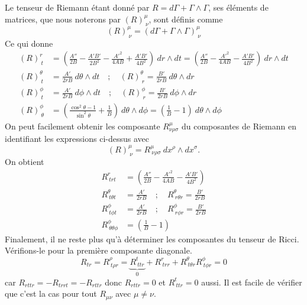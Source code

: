 \documentclass[a4paper,11pt]{report}
\theoremstyle{definition}
\theoremstyle{plain}
\theoremstyle{definition}
\theoremstyle{remark}
\begin{document}
        Le tenseur de Riemann étant donné par $R=d\Gamma+\Gamma\wedge\Gamma$, ses éléments de matrices, que nous noterons par $(R)^\mu_{~\nu}$, sont définis comme
        \begin{equation}
            (R)^\mu_{~\nu} = (d\Gamma+\Gamma\wedge\Gamma)^\mu_{~\nu}
        \end{equation}
        Ce qui donne
        \begin{align}
            (R)^r_{~t} &= \left( \frac{A''}{2B}-\frac{A'B'}{2B^2}-\frac{A'^2}{4AB}+\frac{A'B'}{4B^2} \right)~dr\wedge dt = \left( \frac{A''}{2B}-\frac{A'^2}{4AB}-\frac{A'B'}{4B^2} \right)~dr\wedge dt\\
            (R)^\theta_{~t} &= \frac{A'}{2rB}~d\theta\wedge dt\quad;\quad  (R)^\theta_{~r} = \frac{B'}{2rB}~d\theta\wedge dr\\
            (R)^\phi_{~t} &= \frac{A'}{2rB}~d\phi\wedge dt \quad;\quad (R)^\phi_{~r} = \frac{B'}{2rB}~d\phi\wedge dr\\
            (R)^\phi_{~\theta} &= \left( \frac{\cos^2\theta-1}{\sin^2\theta}+\frac{1}{B} \right)~d\theta\wedge d\phi = \left( \frac{1}{B}-1 \right)~d\theta\wedge d\phi
        \end{align}
        On peut facilement obtenir les composante $R^\mu_{\nu\rho\sigma}$ du composantes de Riemann en identifiant les expressions ci-dessus avec
        \begin{equation}
            (R)^\mu_{~\nu} = R^\mu_{~\nu\rho\sigma}~dx^\rho\wedge dx^\sigma.
        \end{equation}
        On obtient
        \begin{align}
            R^r_{~trt} &= \left( \frac{A''}{2B}-\frac{A'^2}{4AB}-\frac{A'B'}{4B^2} \right)\\
            R^\theta_{~t\theta t} &= \frac{A'}{2rB}\quad;\quad  R^\theta_{~r\theta r} = \frac{B'}{2rB}\\
            R^\phi_{~t\phi t} &= \frac{A'}{2rB} \quad;\quad R^\phi_{~r\phi r} = \frac{B'}{2rB}\\
            R^\phi_{~\theta\theta\phi} &= \left( \frac{1}{B}-1 \right)
        \end{align}
        Finalement, il ne reste plus qu'à déterminer les composantes du tenseur de Ricci. Vérifions-le pour la première composante diagonale.
        \begin{equation}
            R_{tr} = R^\rho_{~t\rho r} = \underbrace{R^t_{~tt r}}_{0}+R^r_{~trr}+R^\theta_{~t\theta r}R^\phi_{~t\phi r} = 0
        \end{equation}
        car $R_{rttr} = -R_{trrt} = -R_{rttr}$ donc $R_{rttr} = 0$ et $R^t_{~tt r} = 0$ aussi. Il est facile de vérifier que c'est la cas pour tout $R_{\mu\nu}$ avec $\mu\neq\nu$.\\
\end{document}
